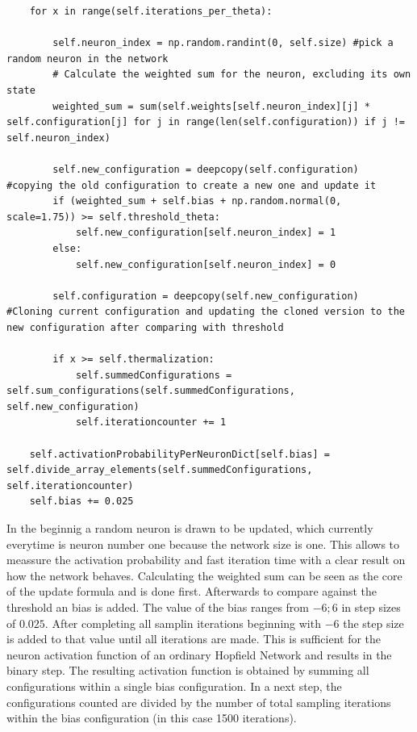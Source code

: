 \begin{lstlisting}
    for x in range(self.iterations_per_theta):
                    
        self.neuron_index = np.random.randint(0, self.size) #pick a random neuron in the network
        # Calculate the weighted sum for the neuron, excluding its own state
        weighted_sum = sum(self.weights[self.neuron_index][j] * self.configuration[j] for j in range(len(self.configuration)) if j != self.neuron_index)

        self.new_configuration = deepcopy(self.configuration)   #copying the old configuration to create a new one and update it
        if (weighted_sum + self.bias + np.random.normal(0, scale=1.75)) >= self.threshold_theta:          
            self.new_configuration[self.neuron_index] = 1
        else:
            self.new_configuration[self.neuron_index] = 0
            
        self.configuration = deepcopy(self.new_configuration)   #Cloning current configuration and updating the cloned version to the new configuration after comparing with threshold

        if x >= self.thermalization:  
            self.summedConfigurations = self.sum_configurations(self.summedConfigurations, self.new_configuration)    
            self.iterationcounter += 1
        
    self.activationProbabilityPerNeuronDict[self.bias] = self.divide_array_elements(self.summedConfigurations, self.iterationcounter)
    self.bias += 0.025
\end{lstlisting}
In the beginnig a random neuron is drawn to be updated, which currently everytime is neuron number one because the network size is one. 
This allows to meassure the activation probability and fast iteration time with a clear result on how the network behaves. 
Calculating the weighted sum can be seen as the core of the update formula and is done first.
Afterwards to compare against the threshold an bias is added.
The value of the bias ranges from \(-6; 6\) in step sizes of \(0.025\). After completing all samplin iterations beginning with \(-6\) the step size is added to that value until all iterations are made.
This is sufficient for the neuron activation function of an ordinary Hopfield Network and results in the binary step. 
The resulting activation function is obtained by summing all configurations within a single bias configuration.
In a next step, the configurations counted are divided by the number of total sampling iterations within the bias configuration (in this case 1500 iterations).
